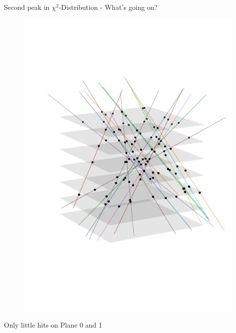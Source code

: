 \documentclass{beamer}
\begin{document}
\begin{frame}{Second peak in \texorpdfstring{\( \chi ^2 \)}{}-Distribution
- What's going on?}
\begin{minipage}{.49\textwidth}
\begin{figure}[H]
	\includegraphics[width=.7\textwidth]{chi2_many_30.png}
    \end{figure}
\end{minipage}
\begin{minipage}{.18\textwidth}
    \footnotesize \begin{turn}{-90}Only little hits on Plane 0 and 1\end{turn}	
\end{minipage}
\end{frame}
\end{document}
